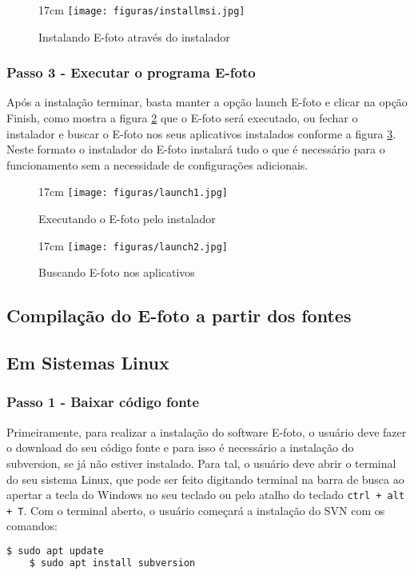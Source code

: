 \begin{figure}[!ht]{17cm}
   \texttt{[image: figuras/installmsi.jpg]}
   \caption{Instalando E-foto através do instalador} \label{fig:installmsi}
\end{figure}
  
\subsubsection{Passo 3 - Executar o programa E-foto}
Após a instalação terminar, basta manter a opção launch E-foto e clicar na opção Finish, como mostra a figura \ref{fig:launch1} que o E-foto será executado, ou fechar o instalador e buscar o E-foto nos seus aplicativos instalados conforme a figura \ref{fig:launch2}. Neste formato o instalador do E-foto instalará tudo o que é necessário para o funcionamento sem a necessidade de configurações adicionais.

\begin{figure}[!ht]{17cm}
	\texttt{[image: figuras/launch1.jpg]}
	\caption{Executando o E-foto pelo instalador} \label{fig:launch1}
\end{figure}

\begin{figure}[!ht]{17cm}
	\texttt{[image: figuras/launch2.jpg]}
	\caption{Buscando E-foto nos aplicativos} \label{fig:launch2}
\end{figure}



\subsection{Compilação do E-foto a partir dos fontes}
\subsection{Em Sistemas Linux}

\subsubsection{Passo 1 - Baixar código fonte}
Primeiramente, para realizar a instalação do software E-foto, o usuário deve fazer o download do seu código fonte e para isso é necessário a instalação do subversion, se já não estiver instalado. Para tal, o usuário deve abrir o terminal do seu sistema Linux, que pode ser feito digitando terminal na barra de busca ao apertar a tecla do Windows no seu teclado ou pelo atalho do teclado \texttt{ctrl + alt + T}. Com o terminal aberto, o usuário começará a instalação do SVN com os comandos: 
\begin{lstlisting}[language=bash]
	$ sudo apt update
	$ sudo apt install subversion
\end{lstlisting}


